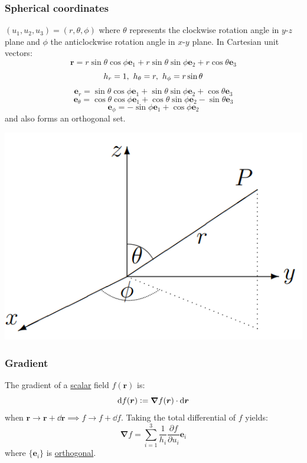 \documentclass{article}
\newcommand{\deq}{\vcentcolon=}
\newcommand{\vc}[1]{\boldsymbol{#1}}
\begin{document}
\begin{multicols*}{3}
\subsubsection*{Spherical coordinates}
$(u_1,u_2,u_3)=(r,\theta,\phi)$ where
$\theta$ represents the clockwise
rotation angle in $y$-$z$ plane
and $\phi$ the anticlockwise
rotation angle in $x$-$y$ plane.
In Cartesian unit vectors:
$$\vc{r}=r\sin\theta\cos\phi\vc{e}_1
+r\sin\theta\sin\phi\vc{e}_2
+r\cos\theta\vc{e}_3$$
$$h_{r}=1,\hspace{0.05in} h_{\theta}=r,
\hspace{0.05in} h_{\phi}=r\sin\theta$$
$$\vc{e}_{r}=\sin\theta\cos\phi\vc{e}_1
+\sin\theta\sin\phi\vc{e}_2+\cos\theta\vc{e}_3$$
$$\vc{e}_{\theta}=\cos\theta\cos\phi\vc{e}_1
+\cos\theta\sin\phi\vc{e}_2-\sin\theta\vc{e}_3$$
$$\vc{e}_{\phi}=-\sin\phi\vc{e}_1+\cos\phi\vc{e}_2$$
and also forms an orthogonal set.
\begin{center}
    \includegraphics[scale=0.3]{f0.png}
\end{center}

\subsubsection*{Gradient}
The gradient of a \underline{scalar} field
$f(\vc{r})$ is:
$$\dd f(\vc{r})\deq\vc{\nabla}f(\vc{r})\cdot\dd\vc{r}$$
when $\vc{r}\rightarrow\vc{r}+\dd\vc{r}
\implies f\rightarrow f+\dd f$.
Taking the total differential of $f$ yields:
$$\vc{\nabla}f=\sum_{i=1}^{3}\frac{1}{h_i}
\frac{\partial f}{\partial u_i}\vc{e}_i$$
where $\{\vc{e}_i\}$ is \underline{orthogonal}.


\end{multicols*}
\end{document}
